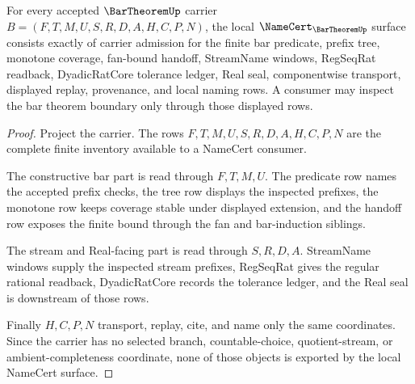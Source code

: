 \begin{theorem}
\label{thm:bar-theorem-namecert-obligations}
For every accepted $\BarTheoremUp$ carrier $B=(F,T,M,U,S,R,D,A,H,C,P,N)$, the local $\NameCert_{\BarTheoremUp}$ surface consists exactly of carrier admission for the finite bar predicate, prefix tree, monotone coverage, fan-bound handoff, StreamName windows, RegSeqRat readback, DyadicRatCore tolerance ledger, Real seal, componentwise transport, displayed replay, provenance, and local naming rows. A consumer may inspect the bar theorem boundary only through those displayed rows.
\end{theorem}
\begin{proof}
Project the carrier. The rows $F,T,M,U,S,R,D,A,H,C,P,N$ are the complete finite inventory available to a NameCert consumer.

The constructive bar part is read through $F,T,M,U$. The predicate row names the accepted prefix checks, the tree row displays the inspected prefixes, the monotone row keeps coverage stable under displayed extension, and the handoff row exposes the finite bound through the fan and bar-induction siblings.

The stream and Real-facing part is read through $S,R,D,A$. StreamName windows supply the inspected stream prefixes, RegSeqRat gives the regular rational readback, DyadicRatCore records the tolerance ledger, and the Real seal is downstream of those rows.

Finally $H,C,P,N$ transport, replay, cite, and name only the same coordinates. Since the carrier has no selected branch, countable-choice, quotient-stream, or ambient-completeness coordinate, none of those objects is exported by the local NameCert surface.
\end{proof}

